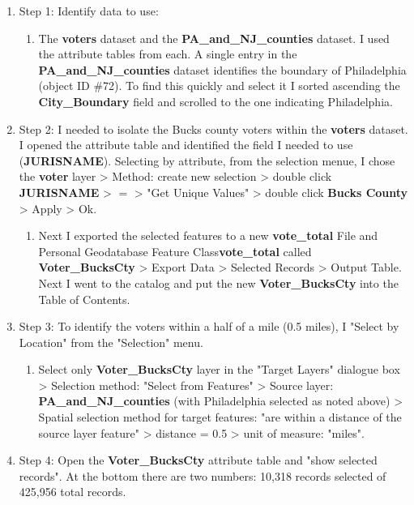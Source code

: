\documentclass[12pt]{article}
\begin{document}
\begin{enumerate}
	\item Step 1:  Identify data to use:
	\begin{enumerate}
		\item The \textbf{voters} dataset and the \textbf{PA\_and\_NJ\_counties} dataset.  I used the attribute tables from each.  A single entry in the \textbf{PA\_and\_NJ\_counties} dataset identifies the boundary of Philadelphia (object ID \#72).  To find this quickly and select it I sorted ascending the \textbf{City\_Boundary} field and scrolled to the one indicating Philadelphia.
	\end{enumerate}
	\item Step 2:  I needed to isolate the Bucks county voters within the \textbf{voters} dataset.  I opened the attribute table and identified the field I needed to use (\textbf{JURISNAME}).  Selecting by attribute, from the selection menue, I chose the \textbf{voter} layer > Method: create new selection > double click \textbf{JURISNAME} > $=$ > "Get Unique Values" > double click \textbf{Bucks County} > Apply > Ok.
	\begin{enumerate}
		\item Next I exported the selected features to a new \textbf{vote\_total} File and Personal Geodatabase Feature Class\textbf{vote\_total} called \textbf{Voter\_BucksCty} > Export Data > Selected Records > Output Table.  Next I went to the catalog and put the new \textbf{Voter\_BucksCty} into the Table of Contents.
	\end{enumerate}
	\item Step 3:  To identify the voters within a half of a mile (0.5 miles), I "Select by Location" from the "Selection" menu.  
	\begin{enumerate}
		\item Select only \textbf{Voter\_BucksCty} layer in the "Target Layers" dialogue box > Selection method:  "Select from Features" > Source layer:  \textbf{PA\_and\_NJ\_counties} (with Philadelphia selected as noted above) > Spatial selection method for target features:  "are within a distance of the source layer feature" > distance = 0.5 > unit of measure:  "miles".
	\end{enumerate}
	\item Step 4:  Open the \textbf{Voter\_BucksCty} attribute table and "show selected records".  At the bottom there are two numbers:  10,318 records selected of 425,956 total records.
\end{enumerate}
\end{document}
